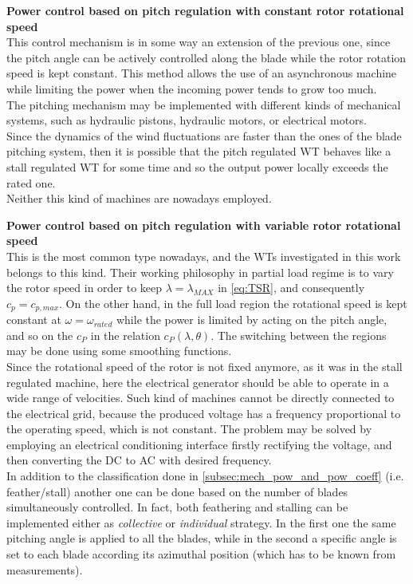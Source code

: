 \textbf{Power control based on pitch regulation with constant rotor rotational speed}\\
This control mechanism is in some way an extension of the previous one, since the pitch angle can be actively controlled along the blade while the rotor rotation speed is kept constant. This method allows the use of an asynchronous machine while limiting the power when the incoming power tends to grow too much. \\
 The pitching mechanism may be implemented with different kinds of mechanical systems, such as hydraulic pistons, hydraulic motors, or electrical motors. \\
Since the dynamics of the wind fluctuations are faster than the ones of the blade pitching system, then it is possible that the pitch regulated WT behaves like a stall regulated \acrshort{WT} for some time and so the output power locally exceeds the rated one.\\
Neither this kind of machines are nowadays employed.

\textbf{Power control based on pitch regulation with variable rotor rotational speed}\\
This is the most common type nowadays, and the \acrshort{WTs} investigated in this work belongs to this kind. Their working philosophy in partial load regime is to vary the rotor speed in order to keep $\lambda = \lambda_{MAX}$ in \autoref{eq:TSR}, and consequently $c_p=c_{p,max}$. On the other hand, in the full load region the rotational speed is kept constant at $\omega = \omega_{rated}$ while the power is limited by acting on the pitch angle, and so on the $c_P$ in the relation $c_P(\lambda, \theta)$. The switching between the regions may be done using some smoothing functions. \\
Since the rotational speed of the rotor is not fixed anymore, as it was in the stall regulated machine, here the electrical generator should be able to operate in a wide range of velocities. Such kind of machines cannot be directly connected to the electrical grid, because the produced voltage has a frequency proportional to the operating speed, which is not constant. The problem may be solved by employing an electrical conditioning interface firstly rectifying the voltage, and then converting the DC to AC with desired frequency. \\
In addition to the classification done in \ref{subsec:mech_pow_and_pow_coeff} (i.e. feather/stall) another one can be done based on the number of blades simultaneously controlled. In fact, both feathering and stalling can be implemented either as \textit{collective} or \textit{individual} strategy. In the first one the same pitching angle is applied to all the blades, while in the second a specific angle is set to each blade according its azimuthal position (which has to be known from measurements).

